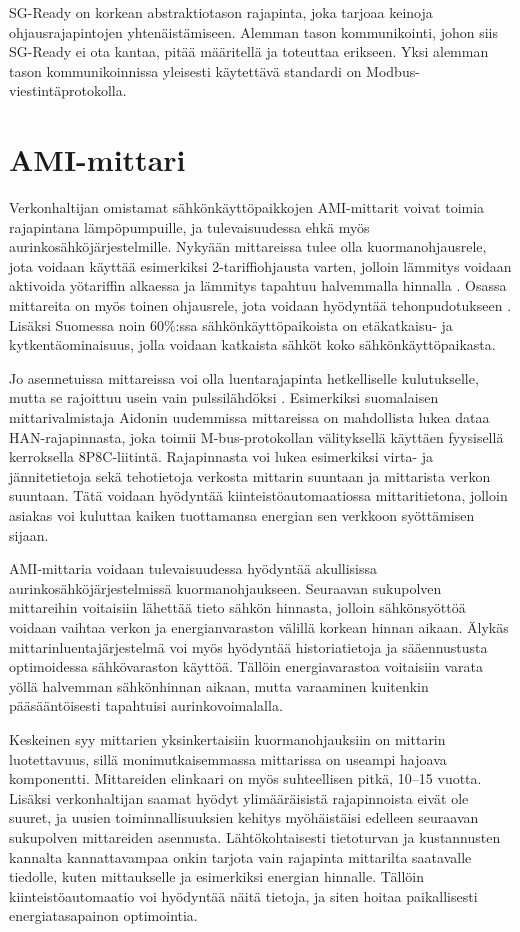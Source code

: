   SG-Ready on korkean abstraktiotason rajapinta, joka tarjoaa keinoja ohjausrajapintojen yhtenäistämiseen. Alemman tason kommunikointi, johon siis SG-Ready ei ota kantaa, pitää määritellä ja toteuttaa erikseen. Yksi alemman tason kommunikoinnissa yleisesti käytettävä standardi on Modbus-viestintäprotokolla.

\section{AMI-mittari}
  Verkonhaltijan omistamat sähkönkäyttöpaikkojen AMI-mittarit voivat toimia rajapintana lämpöpumpuille, ja tulevaisuudessa ehkä myös aurinkosähköjärjestelmille. Nykyään mittareissa tulee olla kuormanohjausrele, jota voidaan käyttää esimerkiksi 2-tariffiohjausta varten, jolloin lämmitys voidaan aktivoida yötariffin alkaessa ja lämmitys tapahtuu halvemmalla hinnalla \parencite{mittariAsetus}. Osassa mittareita on myös toinen ohjausrele, jota voidaan hyödyntää tehonpudotukseen \parencite{kysJousto}. Lisäksi Suomessa noin 60\%:ssa sähkönkäyttöpaikoista on etäkatkaisu- ja kytkentäominaisuus, jolla voidaan katkaista sähköt koko sähkönkäyttöpaikasta. \parencite{AMRNykytila}

  Jo asennetuissa mittareissa voi olla luentarajapinta hetkelliselle kulutukselle, mutta se rajoittuu usein vain pulssilähdöksi \parencite{Aidon5510}. Esimerkiksi suomalaisen mittarivalmistaja Aidonin uudemmissa mittareissa on mahdollista lukea dataa \gls{HAN}-rajapinnasta, joka toimii M-bus-protokollan välityksellä käyttäen fyysisellä kerroksella \gls{8P8C}-liitintä. Rajapinnasta voi lukea esimerkiksi virta- ja jännitetietoja sekä tehotietoja verkosta mittarin suuntaan ja mittarista verkon suuntaan. \parencite{HAN, NVEHAN} Tätä voidaan hyödyntää kiinteistöautomaatiossa mittaritietona, jolloin asiakas voi kuluttaa kaiken tuottamansa energian sen verkkoon syöttämisen sijaan.

  AMI-mittaria voidaan tulevaisuudessa hyödyntää akullisissa aurinkosähköjärjestelmissä kuormanohjaukseen. Seuraavan sukupolven mittareihin voitaisiin lähettää tieto sähkön hinnasta, jolloin sähkönsyöttöä voidaan vaihtaa verkon ja energianvaraston välillä korkean hinnan aikaan. Älykäs mittarinluentajärjestelmä voi myös hyödyntää historiatietoja ja sääennustusta optimoidessa sähkövaraston käyttöä. Tällöin energiavarastoa voitaisiin varata yöllä halvemman sähkönhinnan aikaan, mutta varaaminen kuitenkin pääsääntöisesti tapahtuisi aurinkovoimalalla. \parencite{AMRNykytila}

  Keskeinen syy mittarien yksinkertaisiin kuormanohjauksiin on mittarin luotettavuus, sillä monimutkaisemmassa mittarissa on useampi hajoava komponentti. Mittareiden elinkaari on myös suhteellisen pitkä, 10--15 vuotta. Lisäksi verkonhaltijan saamat hyödyt ylimääräisistä rajapinnoista eivät ole suuret, ja uusien toiminnallisuuksien kehitys myöhäistäisi edelleen seuraavan sukupolven mittareiden asennusta. Lähtökohtaisesti tietoturvan ja kustannusten kannalta kannattavampaa onkin tarjota vain rajapinta mittarilta saatavalle tiedolle, kuten mittaukselle ja esimerkiksi energian hinnalle. Tällöin kiinteistöautomaatio voi hyödyntää näitä tietoja, ja siten hoitaa paikallisesti energiatasapainon optimointia.
